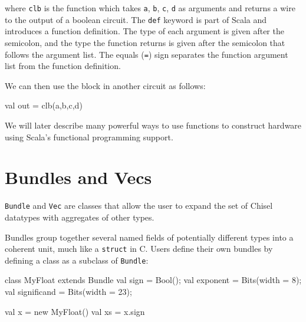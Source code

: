 \documentclass[10pt]{article}
\def\code#1{{\tt #1}}
\begin{document}
\noindent
where \code{clb} is the function which takes \code{a}, \code{b},
\code{c}, \code{d} as arguments and returns a wire to the output of a
boolean circuit.  The \code{def} keyword is part of Scala and
introduces a function definition.  The type of each argument is given
after the semicolon, and the type the function returns is given after
the semicolon that follows the argument list.  The equals (\code{=})
sign separates the function argument list from the function
definition.

We can then use the block in another circuit as follows:
\begin{scala}
val out = clb(a,b,c,d)
\end{scala}






We will later describe many powerful ways to use functions to
construct hardware using Scala's functional programming support.

\section{Bundles and Vecs}

\code{Bundle} and \code{Vec} are classes that allow the user to expand
the set of Chisel datatypes with aggregates of other types.

Bundles group together several named fields of potentially different
types into a coherent unit, much like a \code{struct} in C. Users
define their own bundles by defining a class as a subclass of
\code{Bundle}:
\begin{scala}
class MyFloat extends Bundle {
  val sign        = Bool();
  val exponent    = Bits(width = 8);
  val significand = Bits(width = 23);
}

val x  = new MyFloat()
val xs = x.sign
\end{scala}
\end{document}
